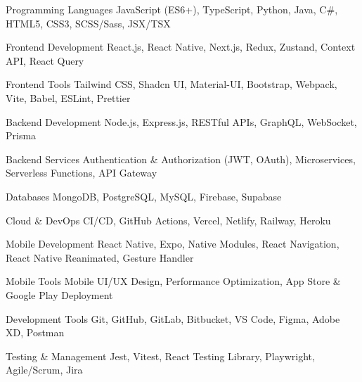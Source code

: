 

\begin{cvskills}

  \cvskill
    {Programming Languages}
    {JavaScript (ES6+), TypeScript, Python, Java, C\#, HTML5, CSS3, SCSS/Sass, JSX/TSX}

  \cvskill
    {Frontend Development}
    {React.js, React Native, Next.js, Redux, Zustand, Context API, React Query}

  \cvskill
    {Frontend Tools}
    {Tailwind CSS, Shadcn UI, Material-UI, Bootstrap, Webpack, Vite, Babel, ESLint, Prettier}

  \cvskill
    {Backend Development}
    {Node.js, Express.js, RESTful APIs, GraphQL, WebSocket, Prisma}

  \cvskill
    {Backend Services}
    {Authentication \& Authorization (JWT, OAuth), Microservices, Serverless Functions, API Gateway}

  \cvskill
    {Databases}
    {MongoDB, PostgreSQL, MySQL, Firebase, Supabase}

  \cvskill
    {Cloud \& DevOps}
    {CI/CD, GitHub Actions, Vercel, Netlify, Railway, Heroku}

  \cvskill
    {Mobile Development}
    {React Native, Expo, Native Modules, React Navigation, React Native Reanimated, Gesture Handler}

  \cvskill
    {Mobile Tools}
    {Mobile UI/UX Design, Performance Optimization, App Store \& Google Play Deployment}

  \cvskill
    {Development Tools}
    {Git, GitHub, GitLab, Bitbucket, VS Code, Figma, Adobe XD, Postman}

  \cvskill
    {Testing \& Management}
    {Jest, Vitest, React Testing Library, Playwright, Agile/Scrum, Jira}

\end{cvskills} 